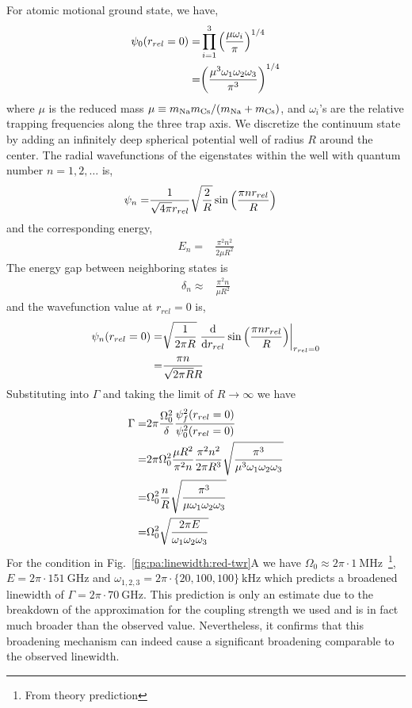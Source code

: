 For atomic motional ground state, we have,
\begin{align*}
  \psi_0{\left({r_{rel}=0}\right)}=&\prod_{i=1}^{3}{\left({\frac{\mu\omega_i}{\pi}}\right)}^{1/4}\\
  =&{\left({\frac{\mu^3\omega_1\omega_2\omega_3}{\pi^3}}\right)}^{1/4}
\end{align*}
where $\mu$ is the reduced mass $\mu\equiv m_{\mathrm{Na}} m_{\mathrm{Cs}}/{\left({m_{\mathrm{Na}}+m_{\mathrm{Cs}}}\right)}$,
and $\omega_i$'s are the relative trapping frequencies along the three trap axis.
We discretize the continuum state by adding an infinitely deep spherical potential well
of radius $R$ around the center. The radial wavefunctions of the eigenstates
within the well with quantum number $n=1,2,\dots$ is,
\begin{align*}
  \psi_n=&\frac{1}{\sqrt{4\pi}r_{rel}}\sqrt{\frac{2}{R}}\sin{\left({\frac{\pi nr_{rel}}{R}}\right)}
\end{align*}
and the corresponding energy,
\begin{align*}
  E_n=&\frac{\pi^2n^2}{2\mu R^2}
\end{align*}
The energy gap between neighboring states is
\begin{align*}
  \delta_n\approx&\frac{\pi^2n}{\mu R^2}
\end{align*}
and the wavefunction value at $r_{rel}=0$ is,
\begin{align*}
  \psi_n{\left({r_{rel}=0}\right)}=&\sqrt{\frac{1}{2\pi R}}\left.\frac{\mathrm{d}}{\mathrm{d} r_{rel}}\sin{\left({\frac{\pi nr_{rel}}{R}}\right)}\right|_{r_{rel}=0}\\
  =&\frac{\pi n}{\sqrt{2\pi R}R}
\end{align*}
Substituting into $\Gamma$ and taking the limit of $R\rightarrow\infty$ we have
\begin{align*}
  \Gamma=&2\pi\frac{\Omega_0^2}{\delta}\frac{\psi_f^2{\left({r_{rel}=0}\right)}}{\psi_0^2{\left({r_{rel}=0}\right)}}\\
  =&2\pi\Omega_0^2\frac{\mu R^2}{\pi^2n}\frac{\pi^2 n^2}{2\pi R^3}\sqrt{\frac{\pi^3}{\mu^3\omega_1\omega_2\omega_3}}\\
  =&\Omega_0^2\frac{n}{R}\sqrt{\frac{\pi^3}{\mu\omega_1\omega_2\omega_3}}\\
  =&\Omega_0^2\sqrt{\frac{2\pi E}{\omega_1\omega_2\omega_3}}
\end{align*}
For the condition in Fig.~\ref{fig:pa:linewidth:red-twr}A
we have $\Omega_0\approx2\pi\cdot1~\mathrm{MHz}$~\footnote{From theory prediction},
$E=2\pi\cdot151~\mathrm{GHz}$ and $\omega_{1,2,3}=2\pi\cdot\{20,100,100\}~\mathrm{kHz}$
which predicts a broadened linewidth of $\Gamma=2\pi\cdot70~\mathrm{GHz}$.
This prediction is only an estimate due to the breakdown of the approximation
for the coupling strength we used and is in fact much broader than the observed value.
Nevertheless, it confirms that this broadening mechanism can indeed cause
a significant broadening comparable to the observed linewidth.

